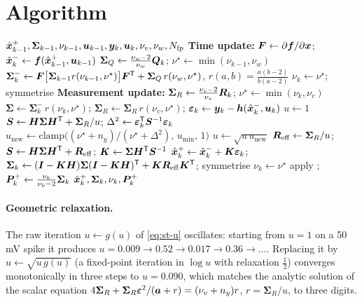 \section{Algorithm}
\begin{algorithm}[H]
\caption{StudentT-KF --- one sampling period (independent-scale branch)}
\begin{algorithmic}[1]
\Require $\hat{\bm{x}}^{+}_{k-1},\bm\Sigma_{k-1},\nu_{k-1},\bm{u}_{k-1},\bm{y}_k,\bm{u}_k,\nu_v,\nu_w,N_{\mathrm{fp}}$
\State \textbf{Time update:} $\bm{F}\gets\partial\bm{f}/\partial\bm{x}$;\;
  $\hat{\bm{x}}^{-}_k\gets\bm{f}(\hat{\bm{x}}^{+}_{k-1},\bm{u}_{k-1})$
\State $\bm\Sigma_Q\gets\frac{\nu_w-2}{\nu_w}\bm{Q}_k$;\;
  $\nu^\star\gets\min(\nu_{k-1},\nu_w)$
\State $\bm\Sigma^-_k\gets\bm{F}\big[\bm\Sigma_{k-1}r(\nu_{k-1},\nu^\star)\big]\bm{F}^{\mathsf{T}}
  +\bm\Sigma_Q\,r(\nu_w,\nu^\star)$, \;
  $r(a,b)=\frac{a(b-2)}{b(a-2)}$ 
\State $\nu_k\gets\nu^\star$; symmetrise
\State \textbf{Measurement update:} $\bm\Sigma_R\gets\frac{\nu_v-2}{\nu_v}\bm{R}_k$;\;
  $\nu^\star\gets\min(\nu_k,\nu_v)$
\State $\bm\Sigma\gets\bm\Sigma^-_k\,r(\nu_k,\nu^\star)$;\;
  $\bm\Sigma_R\gets\bm\Sigma_R\,r(\nu_v,\nu^\star)$;\;
  $\bm{\varepsilon}_k\gets\bm{y}_k-\bm{h}(\hat{\bm{x}}^{-}_k,\bm{u}_k)$
\State $u\gets1$
  \State $\bm{S}\gets\bm{H}\bm\Sigma\bm{H}^{\mathsf{T}}+\bm\Sigma_R/u$;\quad
         $\Delta^2\gets\bm{\varepsilon}_k^{\mathsf{T}}\bm{S}^{-1}\bm{\varepsilon}_k$
  \State $u_{\mathrm{new}}\gets\mathrm{clamp}\big((\nu^\star+n_y)/(\nu^\star+\Delta^2),\,
         u_{\min},\,1\big)$
  \State $u\gets\sqrt{u\,u_{\mathrm{new}}}$ 
\EndFor
\State $\bm{R}_{\mathrm{eff}}\gets\bm\Sigma_R/u$;\;
  $\bm{S}\gets\bm{H}\bm\Sigma\bm{H}^{\mathsf{T}}+\bm{R}_{\mathrm{eff}}$;\;
  $\bm{K}\gets\bm\Sigma\bm{H}^{\mathsf{T}}\bm{S}^{-1}$
\State $\hat{\bm{x}}^{+}_k\gets\hat{\bm{x}}^{-}_k+\bm{K}\bm{\varepsilon}_k$;\;
  $\bm\Sigma_k\gets(\bm{I}-\bm{K}\bm{H})\bm\Sigma(\bm{I}-\bm{K}\bm{H})^{\mathsf{T}}+\bm{K}\bm{R}_{\mathrm{eff}}\bm{K}^{\mathsf{T}}$; symmetrise
\State $\nu_k\gets\nu^\star$ 
\State apply ;\quad
  $\bm{P}^{+}_k\gets\frac{\nu_k}{\nu_k-2}\bm\Sigma_k$
\Ensure $\hat{\bm{x}}^{+}_k,\bm\Sigma_k,\nu_k,\bm{P}^{+}_k$
\end{algorithmic}
\end{algorithm}

\paragraph{Geometric relaxation.}  The raw iteration $u\leftarrow g(u)$ of \eqref{eq:st-u}
oscillates: starting from $u=1$ on a 50\,mV spike it produces
$u=0.009\to0.52\to0.017\to0.36\to\dots$.  Replacing it by $u\leftarrow\sqrt{u\,g(u)}$ (a
fixed-point iteration in $\log u$ with relaxation $\tfrac12$) converges monotonically in three
steps to $u=0.090$, which matches the analytic solution of the scalar equation
$4\bm\Sigma_R+\bm\Sigma_R\bm{\varepsilon}^2/(\bm{a}+r)=(\nu_v+n_y)r$, $r=\bm\Sigma_R/u$, to three digits.


